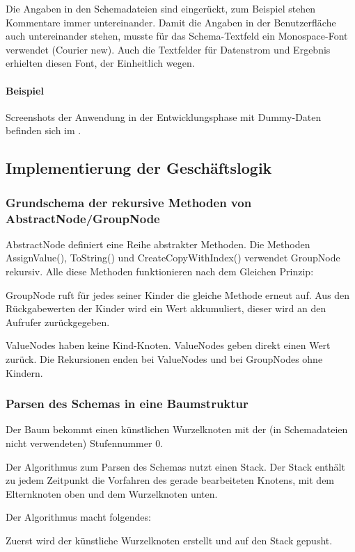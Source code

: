 Die Angaben in den Schemadateien sind eingerückt, zum Beispiel stehen Kommentare immer untereinander. Damit die Angaben in der Benutzerfläche auch untereinander stehen, musste für das Schema-Textfeld ein Monospace-Font verwendet (Courier new). Auch die Textfelder für Datenstrom und Ergebnis erhielten diesen Font, der Einheitlich wegen.
\paragraph{Beispiel}
Screenshots der Anwendung in der Entwicklungsphase mit Dummy-Daten befinden sich im .


\subsection{Implementierung der Geschäftslogik}
\label{sec:ImplementierungGeschaeftslogik}

\subsubsection{Grundschema der rekursive Methoden von AbstractNode/GroupNode}
AbstractNode definiert eine Reihe abstrakter Methoden. Die Methoden AssignValue(), ToString() und CreateCopyWithIndex() verwendet GroupNode rekursiv. Alle diese Methoden funktionieren nach dem Gleichen Prinzip: 

GroupNode ruft für jedes seiner Kinder die gleiche Methode erneut auf. Aus den Rückgabewerten der Kinder wird ein Wert akkumuliert, dieser wird an den Aufrufer zurückgegeben.

ValueNodes haben keine Kind-Knoten. ValueNodes geben direkt einen Wert zurück.
Die Rekursionen enden bei ValueNodes und bei GroupNodes ohne Kindern.

\subsubsection{Parsen des Schemas in eine Baumstruktur}
Der Baum bekommt einen künstlichen Wurzelknoten mit der (in Schemadateien nicht verwendeten) Stufennummer 0.

Der Algorithmus zum Parsen des Schemas nutzt einen Stack. Der Stack enthält zu jedem Zeitpunkt die Vorfahren des gerade bearbeiteten Knotens, mit dem Elternknoten oben und dem Wurzelknoten unten.

Der Algorithmus macht folgendes:

Zuerst wird der künstliche Wurzelknoten erstellt und auf den Stack gepusht.

